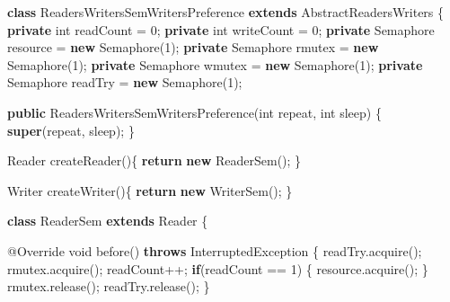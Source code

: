 \documentclass[
]{article}
\newenvironment{Shaded}{\begin{snugshade}}{\end{snugshade}}
\newcommand{\AttributeTok}[1]{\textcolor[rgb]{0.77,0.63,0.00}{#1}}
\newcommand{\BuiltInTok}[1]{#1}
\newcommand{\DataTypeTok}[1]{\textcolor[rgb]{0.13,0.29,0.53}{#1}}
\newcommand{\DecValTok}[1]{\textcolor[rgb]{0.00,0.00,0.81}{#1}}
\newcommand{\FunctionTok}[1]{\textcolor[rgb]{0.00,0.00,0.00}{#1}}
\newcommand{\KeywordTok}[1]{\textcolor[rgb]{0.13,0.29,0.53}{\textbf{#1}}}
\newcommand{\NormalTok}[1]{#1}
\begin{document}
\begin{Shaded}
\begin{Highlighting}[]
\KeywordTok{class}\NormalTok{ ReadersWritersSemWritersPreference }\KeywordTok{extends}\NormalTok{ AbstractReadersWriters}
\NormalTok{\{}
    \KeywordTok{private} \DataTypeTok{int}\NormalTok{ readCount = }\DecValTok{0}\NormalTok{;}
    \KeywordTok{private} \DataTypeTok{int}\NormalTok{ writeCount = }\DecValTok{0}\NormalTok{;}
    \KeywordTok{private} \BuiltInTok{Semaphore}\NormalTok{ resource = }\KeywordTok{new} \BuiltInTok{Semaphore}\NormalTok{(}\DecValTok{1}\NormalTok{);}
    \KeywordTok{private} \BuiltInTok{Semaphore}\NormalTok{ rmutex = }\KeywordTok{new} \BuiltInTok{Semaphore}\NormalTok{(}\DecValTok{1}\NormalTok{);}
    \KeywordTok{private} \BuiltInTok{Semaphore}\NormalTok{ wmutex = }\KeywordTok{new} \BuiltInTok{Semaphore}\NormalTok{(}\DecValTok{1}\NormalTok{);}
    \KeywordTok{private} \BuiltInTok{Semaphore}\NormalTok{ readTry = }\KeywordTok{new} \BuiltInTok{Semaphore}\NormalTok{(}\DecValTok{1}\NormalTok{);}

    \KeywordTok{public} \FunctionTok{ReadersWritersSemWritersPreference}\NormalTok{(}\DataTypeTok{int}\NormalTok{ repeat, }\DataTypeTok{int}\NormalTok{ sleep) \{}
        \KeywordTok{super}\NormalTok{(repeat, sleep);}
\NormalTok{    \}}


    \BuiltInTok{Reader} \FunctionTok{createReader}\NormalTok{()\{}
        \KeywordTok{return} \KeywordTok{new} \FunctionTok{ReaderSem}\NormalTok{();}
\NormalTok{    \}}

    \BuiltInTok{Writer} \FunctionTok{createWriter}\NormalTok{()\{}
        \KeywordTok{return} \KeywordTok{new} \FunctionTok{WriterSem}\NormalTok{();}
\NormalTok{    \}}

    \KeywordTok{class}\NormalTok{ ReaderSem }\KeywordTok{extends} \BuiltInTok{Reader}\NormalTok{ \{}

        \AttributeTok{@Override}
        \DataTypeTok{void} \FunctionTok{before}\NormalTok{() }\KeywordTok{throws} \BuiltInTok{InterruptedException}\NormalTok{ \{}
\NormalTok{            readTry.}\FunctionTok{acquire}\NormalTok{();}
\NormalTok{            rmutex.}\FunctionTok{acquire}\NormalTok{();}
\NormalTok{            readCount++;}
            \KeywordTok{if}\NormalTok{(readCount == }\DecValTok{1}\NormalTok{) \{}
\NormalTok{                resource.}\FunctionTok{acquire}\NormalTok{();}
\NormalTok{            \}}
\NormalTok{            rmutex.}\FunctionTok{release}\NormalTok{();}
\NormalTok{            readTry.}\FunctionTok{release}\NormalTok{();}
\NormalTok{        \}}


\end{Highlighting}
\end{Shaded}
\end{document}

